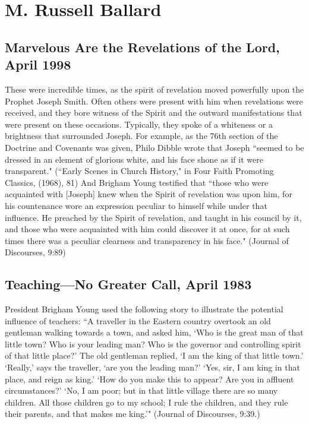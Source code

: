 \section{M. Russell Ballard}

\subsection{Marvelous Are the Revelations of the Lord, April 1998}

These were incredible times, as the spirit of revelation moved powerfully upon the Prophet Joseph Smith. Often others were present with him when revelations were received, and they bore witness of the Spirit and the outward manifestations that were present on these occasions. Typically, they spoke of a whiteness or a brightness that surrounded Joseph. For example, as the 76th section of the Doctrine and Covenants was given, Philo Dibble wrote that Joseph ``seemed to be dressed in an element of glorious white, and his face shone as if it were transparent." (``Early Scenes in Church History," in Four Faith Promoting Classics, (1968), 81) And Brigham Young testified that ``those who were acquainted with [Joseph] knew when the Spirit of revelation was upon him, for his countenance wore an expression peculiar to himself while under that influence. He preached by the Spirit of revelation, and taught in his council by it, and those who were acquainted with him could discover it at once, for at such times there was a peculiar clearness and transparency in his face." (Journal of Discourses, 9:89)

\subsection{Teaching—No Greater Call, April 1983}

President Brigham Young used the following story to illustrate the potential influence of teachers: ``A traveller in the Eastern country overtook an old gentleman walking towards a town, and asked him, `Who is the great man of that little town? Who is your leading man? Who is the governor and controlling spirit of that little place?' The old gentleman replied, `I am the king of that little town.' `Really,' says the traveller, `are you the leading man?' `Yes, sir, I am king in that place, and reign as king.' `How do you make this to appear? Are you in affluent circumstances?' `No, I am poor; but in that little village there are so many children. All those children go to my school; I rule the children, and they rule their parents, and that makes me king.'" (Journal of Discourses, 9:39.)